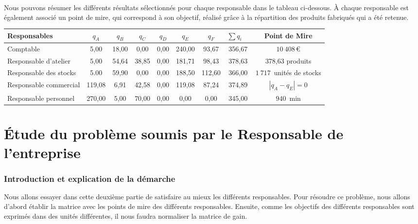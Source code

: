 \documentclass[paper=a4, fontsize=11pt]{report}
\numberwithin{equation}{section}		%
\numberwithin{figure}{section}			%
\numberwithin{table}{section}				%
\newcommand\abs[1]{\left|#1\right|}
\begin{document}
Nous pouvons résumer les différents résultats sélectionnés pour chaque responsable dans le tableau ci-dessous. À chaque responsable est également associé un point de mire, qui correspond à son objectif, réalisé grâce à la répartition des produits fabriqués qui a été retenue.

\begin{center}
\begin{tabular}{l|cccccc|cc}
\hline
Responsables & $q_A$ & $q_B$ & $q_C$ & $q_D$ & $q_E$ & $q_F$ & $\sum q_i \quad$ & Point de Mire \\
\hline
Comptable & 5,00 & 18,00 & 0,00 & 0,00 & 240,00 & 93,67 & 356,67 & $10 \:408\,$€\\
Responsable d'atelier & 5,00 & 54,64 & 38,85 & 0,00 & 181,71 & 98,43 & 378,63 & 378,63 produits\\
Responsable des stocks & 5.00 & 59,90 & 0,00 & 0,00 & 188,50 & 112,60 & 366,00 & $1\:717\,$ unités de stocks\\
Responsable commercial & 119,08 & 6,91 & 42,58 & 0,00 & 119,08 & 87,24 & 374,89 & $\abs{q_A - q_E}=0$\\
Responsable personnel & 270,00 & 5,00 & 70,00 & 0,00 & 0,00 & 0,00 & 345,00 & $940\,$ min \\

\hline
\end{tabular}
\end{center}
\part{\'Etude du problème soumis par le Responsable de l'entreprise}
\setcounter{section}{0}

\section{Introduction et explication de la démarche}

Nous allons essayer dans cette deuxième partie de satisfaire au mieux les différents responsables. Pour résoudre ce problème, nous allons d'abord établir la matrice avec les points de mire des différents responsables. Ensuite, comme les objectifs des différents responsables sont exprimés dans des unités différentes, il nous faudra normaliser la matrice de gain.
\end{document}
